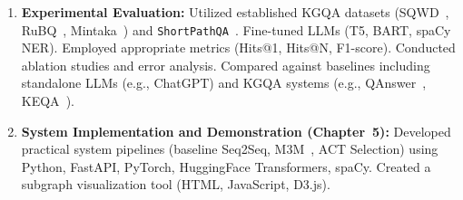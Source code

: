 \begin{enumerate}
    \item \textbf{Experimental Evaluation:} Utilized established KGQA datasets (SQWD~\cite{SQ_WD}, RuBQ~\cite{korablinov2020rubq}, Mintaka~\cite{DBLP:conf/coling/SenAS22-mintaka}) and \texttt{ShortPathQA}~\cite{DBLP:conf/nldb/SalnikovSPQA25}. Fine-tuned LLMs (T5, BART, spaCy NER). Employed appropriate metrics (Hits@1, Hits@N, F1-score). Conducted ablation studies and error analysis. Compared against baselines including standalone LLMs (e.g., ChatGPT) and KGQA systems (e.g., QAnswer~\cite{diefenbach2020towards}, KEQA~\cite{Huang2019KnowledgeGE}).
    \item \textbf{System Implementation and Demonstration (Chapter~5):} Developed practical system pipelines (baseline Seq2Seq, M3M~\cite{DBLP:conf/acl/RazzhigaevSMBP23}, ACT Selection) using Python, FastAPI, PyTorch, HuggingFace Transformers, spaCy. Created a subgraph visualization tool (HTML, JavaScript, D3.js).
\end{enumerate}

